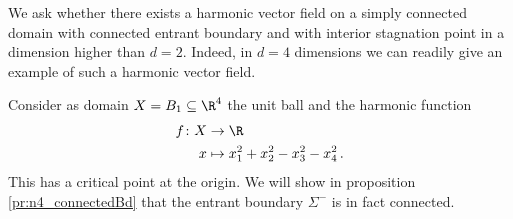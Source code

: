 We ask whether there exists a harmonic vector field on a simply connected domain with connected entrant boundary and with interior stagnation point 
in a dimension higher than $d=2$. Indeed, in $d=4$ dimensions we can readily give an example
of such a harmonic vector field.
\begin{example}[Connected entrant boundary in $d=4$ dimensions]\label{ex:n4}
  Consider as domain $X=B_1\subseteq\R^4$ the unit ball and
  the harmonic function 
  \begin{equation}
    \begin{aligned}
    f\colon X&\to \R \\
    x &\mapsto x_1^2+x_2^2-x_3^2-x_4^2\,.
    \end{aligned}
    \label{eq:n4_deff}
  \end{equation}
  This has a critical point at the origin.
  We will show in proposition \ref{pr:n4_connectedBd} that the entrant boundary $\Sigma^-$ is
  in fact connected.
\end{example}


